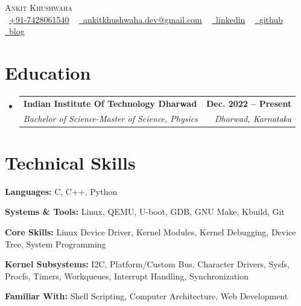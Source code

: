 \documentclass[letterpaper,11pt]{article}
\makeatletter
\newcommand{\resumeSubheading}[4]{
  \vspace{-2pt}
\item
  \begin{tabular*}{1.0\textwidth}[t]{l@{\extracolsep{\fill}}r}
    \textbf{#1} & \textbf{\small #2} \\
    \textit{\small#3} & \textit{\small #4} \\
  \end{tabular*}\vspace{-7pt}
}
\newcommand{\resumeSubHeadingListStart}{
\begin{itemize}[leftmargin=0.0in, label={}]}
\newcommand{\resumeSubHeadingListEnd}{
\end{itemize}}
\makeatother
\begin{document}
\begin{center}
  {\Huge \scshape Ankit Khushwaha} \\ \vspace{2pt}
  \raisebox{-0.2\height}\faPhone\ \href{tel:+917428061540}{\underline{+91-7428061540}} ~
  \href{mailto:ankitkhushwaha.dev@gmail.com}{\raisebox{-0.2\height}\faEnvelope\
  \underline{ankitkhushwaha.dev@gmail.com}} ~
  \href{https://www.linkedin.com/in/ankit-khushwaha-2073a0252/}{\raisebox{-0.2\height}\faLinkedin\ \underline{linkedin}}
  ~
  \href{https://github.com/ankitkhushwaha}{\raisebox{-0.2\height}\faGithub\ \underline{github}}
  ~
  \href{https://ankitkdev.com/}{\raisebox{-0.2\height}\faGlobe\ \underline{blog}}

  \vspace{-8pt}
\end{center}

\section{Education}
\resumeSubHeadingListStart
\resumeSubheading
{Indian Institute Of Technology Dharwad}{Dec. 2022 -- Present}
{Bachelor of Science-Master of Science, Physics}{Dharwad, Karnataka}
\resumeSubHeadingListEnd
\vspace{-16pt}


\section{Technical Skills}
\begin{itemize}[leftmargin=0.15in, label={}]
    \small{
    \item \textbf{Languages:} C, C++, Python\\
      \vspace{-2pt}
    \item \textbf{Systems \& Tools:} Linux, QEMU, U-boot, GDB, GNU Make, Kbuild, Git \\
      \vspace{-2pt}
    \item \textbf{Core Skills:} Linux Device Driver, Kernel Modules,
 Kernel Debugging, Device Tree, System Programming \\

      \vspace{-2pt}
    \item \textbf{Kernel Subsystems:} I2C, Platform/Custom Bus, Character Drivers, Sysfs, Procfs, Timers, Workqueues, Interrupt Handling, Synchronization \\

      \vspace{-2pt}
    \item \textbf{Familiar With:}  Shell Scripting, Computer Architecture, Web Development\\
    }
\vspace{-2pt}
\end{itemize}
\vspace{-18pt}
\end{document}
